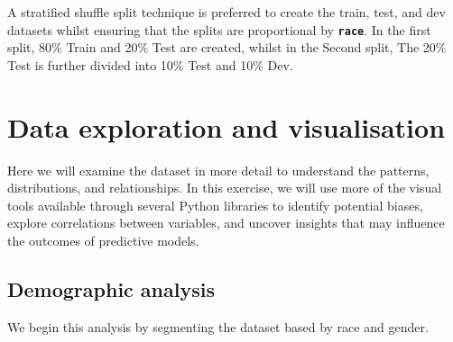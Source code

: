 A stratified shuffle split technique is preferred to create the train, test, and dev datasets whilst ensuring that the splits are proportional by \textbf{\texttt{race}}. In the first split, 80\% Train and 20\% Test are created, whilst in the Second split, The 20\% Test is further divided into 10\% Test and 10\% Dev.


\section{Data exploration and visualisation}

Here we will examine the dataset in more detail to understand the patterns, distributions, and relationships. In this exercise, we will use more of the visual tools available through several Python libraries to identify potential biases, explore correlations between variables, and uncover insights that may influence the outcomes of predictive models. 

\subsection {Demographic analysis}

We begin this analysis by segmenting the dataset based by race and gender.





